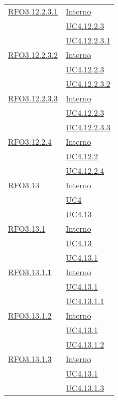 \begin{longtable}{|>{\centering}m{5cm}|m{5cm}<{\centering}|}
\hyperlink{RFO3.12.2.3.1}{RFO3.12.2.3.1} & \hyperlink{Interno}{Interno}\\ &\hyperref[UC4.12.2.3]{UC4.12.2.3}\\ &\hyperref[UC4.12.2.3.1]{UC4.12.2.3.1}\\ \hline

\hyperlink{RFO3.12.2.3.2}{RFO3.12.2.3.2} & \hyperlink{Interno}{Interno}\\ &\hyperref[UC4.12.2.3]{UC4.12.2.3}\\ &\hyperref[UC4.12.2.3.2]{UC4.12.2.3.2}\\ \hline

\hyperlink{RFO3.12.2.3.3}{RFO3.12.2.3.3} &  \hyperlink{Interno}{Interno}\\ &\hyperref[UC4.12.2.3]{UC4.12.2.3}\\ &\hyperref[UC4.12.2.3.3]{UC4.12.2.3.3}\\ \hline

\hyperlink{RFO3.12.2.4}{RFO3.12.2.4} &  \hyperlink{Interno}{Interno}\\ &\hyperref[UC4.12.2]{UC4.12.2}\\ &\hyperref[UC4.12.2.4]{UC4.12.2.4}\\ \hline

\hyperlink{RFO3.13}{RFO3.13} & \hyperlink{Interno}{Interno}\\ &\hyperref[UC4]{UC4}\\ &\hyperref[UC4.13]{UC4.13}\\ \hline

\hyperlink{RFO3.13.1}{RFO3.13.1} & \hyperlink{Interno}{Interno}\\ &\hyperref[UC4.13]{UC4.13}\\ &\hyperref[UC4.13.1]{UC4.13.1}\\ \hline

\hyperlink{RFO3.13.1.1}{RFO3.13.1.1} &  \hyperlink{Interno}{Interno}\\ &\hyperref[UC4.13.1]{UC4.13.1}\\ &\hyperref[UC4.13.1.1]{UC4.13.1.1}\\ \hline

\hyperlink{RFO3.13.1.2}{RFO3.13.1.2} & \hyperlink{Interno}{Interno}\\ &\hyperref[UC4.13.1]{UC4.13.1}\\ &\hyperref[UC4.13.1.2]{UC4.13.1.2}\\ \hline

\hyperlink{RFO3.13.1.3}{RFO3.13.1.3} &  \hyperlink{Interno}{Interno}\\ &\hyperref[UC4.13.1]{UC4.13.1}\\ &\hyperref[UC4.13.1.3]{UC4.13.1.3}\\ \hline


\end{longtable}
